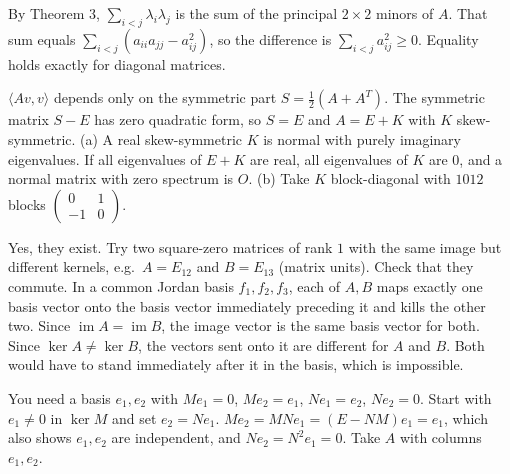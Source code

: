 \documentclass[11pt,a4paper]{article}
\begin{document}
By Theorem 3, \(\sum_{i\lt j}\lambda_i\lambda_j\) is the sum of the principal \(2\times2\) minors of \(A\).
That sum equals \(\sum_{i\lt j}(a_{ii}a_{jj}-a_{ij}^2)\), so the difference is \(\sum_{i\lt j}a_{ij}^2\ge0\). Equality holds exactly for diagonal matrices.

\(\langle Av,v\rangle\) depends only on the symmetric part \(S=\frac12(A+A^T)\). The symmetric matrix \(S-E\) has zero quadratic form, so \(S=E\) and \(A=E+K\) with \(K\) skew-symmetric.
(a) A real skew-symmetric \(K\) is normal with purely imaginary eigenvalues. If all eigenvalues of \(E+K\) are real, all eigenvalues of \(K\) are \(0\), and a normal matrix with zero spectrum is \(O\). (b) Take \(K\) block-diagonal with \(1012\) blocks \(\begin{pmatrix}0&1\\-1&0\end{pmatrix}\).

Yes, they exist. Try two square-zero matrices of rank \(1\) with the same image but different kernels, e.g.~\(A=E_{12}\) and \(B=E_{13}\) (matrix units). Check that they commute.
In a common Jordan basis \(f_1,f_2,f_3\), each of \(A,B\) maps exactly one basis vector onto the basis vector immediately preceding it and kills the other two. Since \(\operatorname{im}A=\operatorname{im}B\), the image vector is the same basis vector for both.
Since \(\ker A\ne\ker B\), the vectors sent onto it are different for \(A\) and \(B\). Both would have to stand immediately after it in the basis, which is impossible.

You need a basis \(e_1,e_2\) with \(Me_1=0\), \(Me_2=e_1\), \(Ne_1=e_2\), \(Ne_2=0\). Start with \(e_1\ne0\) in \(\ker M\) and set \(e_2=Ne_1\).
\(Me_2=MNe_1=(E-NM)e_1=e_1\), which also shows \(e_1,e_2\) are independent, and \(Ne_2=N^2e_1=0\). Take \(A\) with columns \(e_1,e_2\).
\end{document}
